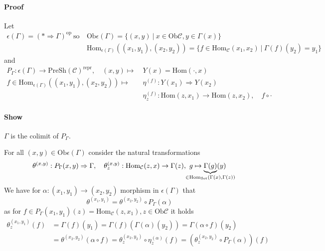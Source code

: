 \paragraph{Proof} Let
\begin{align*}
    \epsilon(\Gamma) = (* \Rightarrow \Gamma)^{\mathrm{op}} \ \text{so} \ &\mathrm{Ob}\epsilon(\Gamma) = \{ (x, y) \ | \ x \in \mathrm{Ob}\mathcal{C}, y \in \Gamma(x)\} \\
    &\mathrm{Hom}_{\epsilon(\Gamma)}((x_1, y_1), (x_2, y_2)) = \{ f \in \mathrm{Hom}_{\mathcal{C}}(x_1, x_2) \ | \ \Gamma(f)(y_2) = y_1 \}
\end{align*}
and
\begin{align*}
    P_\Gamma: \epsilon(\Gamma) \to \mathrm{PreSh}(\mathcal{C})^{\mathrm{repr}}, \quad (x, y) \mapsto \ &Y(x) = \mathrm{Hom}(\cdot, x) \\
    f \in \mathrm{Hom}_{\epsilon(\Gamma)}((x_1, y_1), (x_2, y_2)) \mapsto \ &\eta^{(f)}: Y(x_1) \Rightarrow Y(x_2) \\
    &\eta^{(f)}_z: \mathrm{Hom}(z, x_1) \to \mathrm{Hom}(z, x_2), \quad f \circ \cdot
\end{align*}
\paragraph{Show} $\Gamma$ is the colimit of $P_\Gamma$.

For all $(x, y) \in \mathrm{Ob}\epsilon(\Gamma)$ consider the natural transformations
\begin{align*}
    \theta^{(x, y)}: P_\Gamma(x, y) \Rightarrow \Gamma, \quad \theta^{(x, y)}_z: \mathrm{Hom}_{\mathcal{C}}(z, x) \to \Gamma(z), \ g \mapsto \underbrace{\Gamma(g)}_{\mathclap{\in \mathrm{Hom}_{\mathrm{Set}}(\Gamma(x), \Gamma(z))}}(y)
\end{align*}
We have for $\alpha: (x_1, y_1) \to (x_2, y_2)$ morphism in $\epsilon(\Gamma)$ that
\begin{equation*}
    \theta^{(x_1, y_1)} = \theta^{(x_2, y_2)} \circ P_\Gamma(\alpha)
\end{equation*}
as for $f \in P_\Gamma(x_1, y_1)(z) = \mathrm{Hom}_{\mathcal{C}}(z, x_1), z \in \mathrm{Ob}\mathcal{C}$ it holds
\begin{align*}
    \theta^{(x_1, y_1)}_z(f) &= \Gamma(f)(y_1) = \Gamma(f)(\Gamma(\alpha)(y_2)) = \Gamma(\alpha \circ f)(y_2) \\
    &= \theta^{(x_2, y_2)}(\alpha \circ f) = \theta^{(x_2, y_2)}_z \circ \eta^{(\alpha)}_z(f) = (\theta^{(x_2, y_2)}_z \circ P_\Gamma(\alpha))(f)
\end{align*} 

